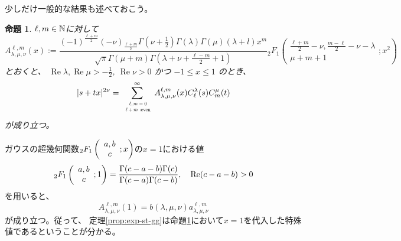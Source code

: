 \documentclass[12pt,a4paper,dvipdfmx]{jsarticle}
\numberwithin{equation}{section}
\newcommand{\tmop}[1]{\ensuremath{\operatorname{#1}}}
\newcommand{\assign}{:=}
\theoremstyle{jplain}
\newtheorem{prop}[thm]{命題}
\theoremstyle{remark}
\theoremstyle{definition}
\begin{document}
	少しだけ一般的な結果も述べておこう。
	\begin{prop}\label{prop:exp-stz-gg}
		$\ell,m\in\mathbb{N}$に対して
		    \begin{equation*}
			    A^{\ell,m}_{\lambda,\mu,\nu} (x) \assign
			    \frac{(-1)^{\frac{\ell+m}{2}}(-\nu)_{\frac{\ell+m}{2}}\Gamma \left( \nu + \frac{1}{2} \right) \Gamma
				  (\lambda) \Gamma (\mu) (\lambda + l) x^m }{\sqrt{\pi} \Gamma
				      (\mu + m) \Gamma \left( \lambda + \nu + \frac{\ell - m}{2} + 1 \right)}
				    {}_2 F_1 \left( \begin{array}{c}
				\frac{\ell + m}{2} - \nu, \frac{m - \ell}{2} - \nu - \lambda\\
				\mu + m + 1
			\end{array} ; x^2 \right)
		\end{equation*}
		とおくと、
		  $\tmop{Re} \lambda, \tmop{Re} \mu > - \frac{1}{2}$,
		    $\tmop{Re} \nu > 0$ かつ $-1 \leqslant x \leqslant 1$ のとき、
		\begin{equation*}
			       | s + t x |^{2 \nu}  = \sum_{\scalebox{0.6}{
			      $\begin{array}[]{c}
				  \ell,m=0\\\ell+ m\mbox{ :even}
				\end{array}
			$}}^{\infty} A^{\ell,m}_{\lambda,\mu,\nu}
				 (x) C_\ell^{\lambda} (s) C_m^{\mu} (t)
		    \end{equation*}
		    が成り立つ。
    \end{prop}
    ガウスの超幾何関数$_2F_1\left(\begin{array}[]{c}
	    a,b\\c
    \end{array};x\right)$の$x=1$における値
\begin{equation*}
		{}_2F_1\left( \begin{array}[]{c}
			a,b\\c
		\end{array};1\right)=\frac{\Gamma(c-a-b)\Gamma(c)}{\Gamma(c-a)\Gamma(c-b)},\quad \Re(c-a-b)>0
	\end{equation*}
	を用いると、\begin{equation*}
		A^{\ell,m}_{\lambda,\mu,\nu}(1)=b(\lambda,\mu,\nu)a^{
		\ell,m}_{\lambda,\mu,\nu}
	\end{equation*}が成り立つ。従って、
	定理\ref{prop:exp-st-gg}は命題\ref{prop:exp-stz-gg}において$x=1$を代入した特{殊}
	値であるということが分かる。
\end{document}

